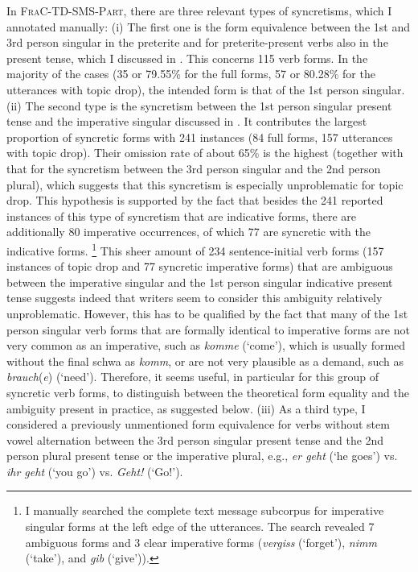 In \textsc{FraC-TD-SMS-Part}, there are three relevant types of syncretisms, which I annotated manually:
(i) The first one is the form equivalence between the 1st and 3rd person singular in the preterite and for preterite-present verbs also in the present tense, which I discussed in .
This concerns 115 verb forms.
In the majority of the cases (35 or 79.55\% for the full forms, 57 or 80.28\% for the utterances with topic drop), the intended form is that of the 1st person singular.
(ii) The second type is the syncretism between the 1st person singular present tense and the imperative  singular discussed in .
It contributes the largest proportion of syncretic forms with 241 instances (84 full forms, 157 utterances with topic drop).
Their omission rate of about 65\% is the highest (together with that for the syncretism between the 3rd person singular and the 2nd person plural), which suggests that this syncretism is especially unproblematic for topic drop.
This hypothesis is supported by the fact that besides the 241 reported instances of this type of syncretism that are indicative forms, there are additionally 80 imperative  occurrences, of which 77 are syncretic with the indicative forms.%
\footnote{I manually searched the complete text message subcorpus for imperative  singular forms at the left edge of the utterances.
The search revealed 7 ambiguous forms and 3 clear imperative forms (\textit{vergiss} (`forget'), \textit{nimm} (`take'), and \textit{gib} (`give')).
}
This sheer amount of 234 sentence-initial verb forms (157 instances of topic drop and 77 syncretic imperative forms) that are ambiguous between the imperative singular and the 1st person singular indicative present tense suggests indeed that writers seem to consider this ambiguity relatively unproblematic.
However, this has to be qualified by the fact that many of the 1st person singular verb forms that are formally identical to imperative forms are not very common as an imperative,  such as \textit{komme} (`come'), which is usually formed without the final schwa as \textit{komm}, or are not very plausible as a demand, such as \textit{brauch}(\textit{e}) (`need').
Therefore, it seems useful, in particular for this group of syncretic verb forms, to distinguish between the theoretical form equality and the ambiguity present in practice, as suggested below.
(iii) As a third type, I considered a previously unmentioned form equivalence for verbs without stem vowel alternation between the 3rd person singular present tense and the 2nd person plural present tense or the imperative  plural, e.g., \textit{er geht} (`he goes') vs. \textit{ihr geht} (`you go') vs. \textit{Geht!} (`Go!').
